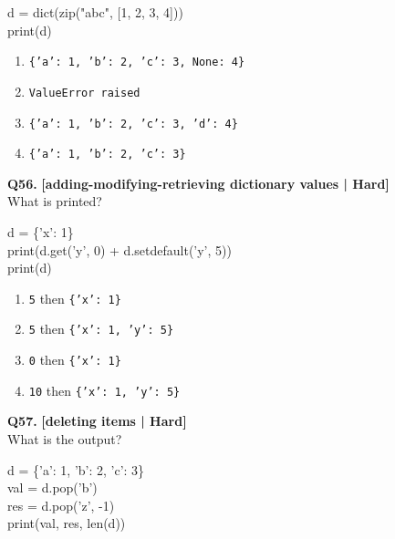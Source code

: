 \begin{pycode}
d = dict(zip("abc", [1, 2, 3, 4]))\\
print(d)
\end{pycode}

\begin{enumerate}[label=(\alph*),topsep=2pt,itemsep=1pt,partopsep=0pt,parsep=0pt]
    \item \relax \texttt{\{'a': 1, 'b': 2, 'c': 3, None: 4\}}
    \item \relax \texttt{ValueError raised}
    \item \relax \texttt{\{'a': 1, 'b': 2, 'c': 3, 'd': 4\}}
    \item \relax \texttt{\{'a': 1, 'b': 2, 'c': 3\}}
\end{enumerate}
\vspace{2mm}

\noindent\textbf{Q56.} \hfill {\small\color{LPUOrange}\textbf{[adding-modifying-retrieving dictionary values | Hard]}}\\[2pt]
What is printed? 

\begin{pycode}
d = \{'x': 1\}\\
print(d.get('y', 0) + d.setdefault('y', 5))\\
print(d)
\end{pycode}

\begin{enumerate}[label=(\alph*),topsep=2pt,itemsep=1pt,partopsep=0pt,parsep=0pt]
    \item \relax \texttt{5} then \texttt{\{'x': 1\}}
    \item \relax \texttt{5} then \texttt{\{'x': 1, 'y': 5\}}
    \item \relax \texttt{0} then \texttt{\{'x': 1\}}
    \item \relax \texttt{10} then \texttt{\{'x': 1, 'y': 5\}}
\end{enumerate}
\vspace{2mm}

\noindent\textbf{Q57.} \hfill {\small\color{LPUOrange}\textbf{[deleting items | Hard]}}\\[2pt]
What is the output? 

\begin{pycode}
d = \{'a': 1, 'b': 2, 'c': 3\}\\
val = d.pop('b')\\
res = d.pop('z', -1)\\
print(val, res, len(d))
\end{pycode}

